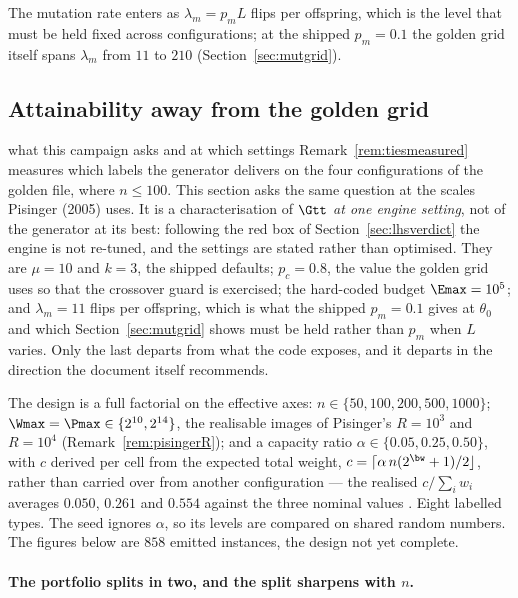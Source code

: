 The mutation rate enters as $\lambda_m=p_mL$ flips per offspring, which is the level that must
be held fixed across configurations; at the shipped $p_m=0.1$ the golden grid itself spans
$\lambda_m$ from $11$ to $210$ (Section~\ref{sec:mutgrid}).

\subsection{Attainability away from the golden grid}\label{sec:attainability}

\begin{whatis}{what this campaign asks and at which settings}
Remark~\ref{rem:tiesmeasured} measures which labels the generator delivers on the four
configurations of the golden file, where $n\le100$. This section asks the same question at the
scales Pisinger (2005) uses. It is a characterisation of $\Gtt$ \emph{at one engine setting},
not of the generator at its best: following the red box of Section~\ref{sec:lhsverdict} the
engine is not re-tuned, and the settings are stated rather than optimised. They are
$\mu=10$ and $k=3$, the shipped defaults; $p_c=0.8$, the value the golden grid uses so that the
crossover guard is exercised; the hard-coded budget $\Emax=10^{5}$; and $\lambda_m=11$ flips
per offspring, which is what the shipped $p_m=0.1$ gives at $\theta_0$ and which
Section~\ref{sec:mutgrid} shows must be held rather than $p_m$ when $L$ varies. Only the last
departs from what the code exposes, and it departs in the direction the document itself
recommends.
\end{whatis}

The design is a full factorial on the effective axes: $n\in\{50,100,200,500,1000\}$;
$\Wmax=\Pmax\in\{2^{10},2^{14}\}$, the realisable images of Pisinger's $R=10^{3}$ and
$R=10^{4}$ (Remark~\ref{rem:pisingerR}); and a capacity ratio $\alpha\in\{0.05,0.25,0.50\}$,
with $c$ derived per cell from the expected total weight, $c=\lceil\alpha\,n(2^{\bw}+1)/2\rfloor$,
rather than carried over from another configuration --- the realised $c/\sum_iw_i$ averages
$0.050$, $0.261$ and $0.554$ against the three nominal values . Eight labelled types.
The seed ignores $\alpha$, so its levels are compared on shared random numbers. The figures
below are $858$ emitted instances, the design not yet complete.

\paragraph{The portfolio splits in two, and the split sharpens with $n$.}

